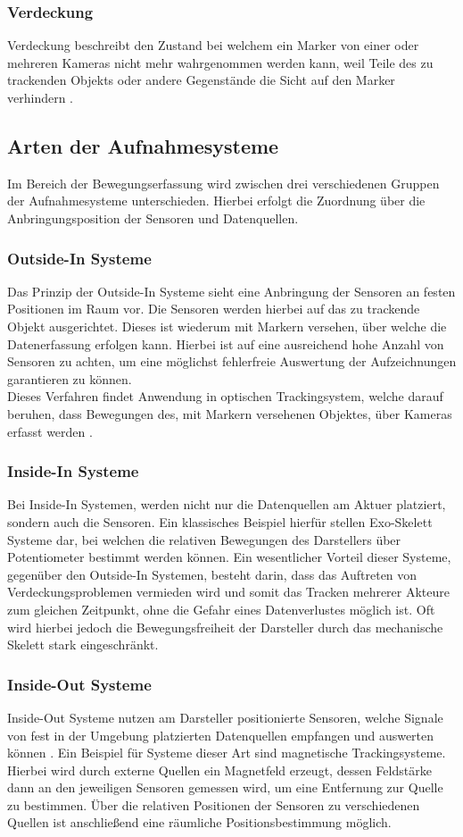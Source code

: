 \subsubsection{Verdeckung}
Verdeckung beschreibt den Zustand bei welchem ein Marker von einer oder mehreren Kameras nicht mehr wahrgenommen werden kann, weil Teile des zu trackenden Objekts oder andere Gegenstände die Sicht auf den Marker verhindern \cite{occlusion}.

\subsection{Arten der Aufnahmesysteme}
Im Bereich der Bewegungserfassung wird zwischen drei verschiedenen Gruppen der Aufnahmesysteme unterschieden. Hierbei erfolgt die Zuordnung über die Anbringungsposition der Sensoren und Datenquellen. \cite{P25}
\subsubsection{Outside-In Systeme}
Das Prinzip der Outside-In Systeme sieht eine Anbringung der Sensoren an festen Positionen im Raum vor. Die Sensoren werden hierbei auf das zu trackende Objekt ausgerichtet. Dieses ist wiederum mit Markern versehen, über welche die Datenerfassung erfolgen kann.
Hierbei ist auf eine ausreichend hohe Anzahl von Sensoren zu achten, um eine möglichst fehlerfreie Auswertung der Aufzeichnungen garantieren zu können. \cite{P25}
\\Dieses Verfahren findet Anwendung in optischen Trackingsystem, welche darauf beruhen, dass Bewegungen des, mit Markern versehenen Objektes, über Kameras erfasst werden \cite{optsys2}.
\subsubsection{Inside-In Systeme}
Bei Inside-In Systemen, werden nicht nur die Datenquellen am Aktuer platziert, sondern auch die Sensoren.
Ein klassisches Beispiel hierfür stellen Exo-Skelett Systeme dar, bei welchen die relativen Bewegungen des Darstellers über Potentiometer bestimmt werden können.
Ein wesentlicher Vorteil dieser Systeme, gegenüber den Outside-In Systemen, besteht darin, dass das Auftreten von Verdeckungsproblemen vermieden wird und somit das Tracken mehrerer Akteure zum gleichen Zeitpunkt, ohne die Gefahr eines Datenverlustes möglich ist.
Oft wird hierbei jedoch die Bewegungsfreiheit der Darsteller durch das mechanische Skelett stark eingeschränkt. \cite{optsys2}
\subsubsection{Inside-Out Systeme}
Inside-Out Systeme nutzen am Darsteller positionierte Sensoren, welche Signale von fest in der Umgebung platzierten Datenquellen empfangen und auswerten können \cite{P25}.
Ein Beispiel für Systeme dieser Art sind magnetische Trackingsysteme. Hierbei wird durch externe Quellen ein Magnetfeld erzeugt, dessen Feldstärke dann an den jeweiligen Sensoren gemessen wird, um eine Entfernung zur Quelle zu bestimmen. Über die relativen Positionen der Sensoren zu verschiedenen Quellen ist anschließend eine räumliche Positionsbestimmung möglich. \cite{optsys2}

